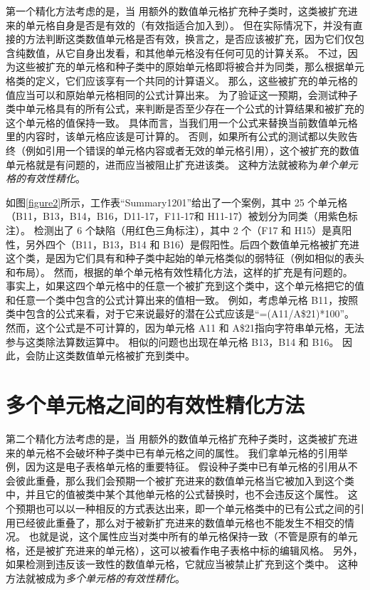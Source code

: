 第一个精化方法考虑的是，当 \wa 用额外的数值单元格扩充种子类时，这类被扩充进来的单元格自身是否是有效的（有效指适合加入到）。
但在实际情况下，并没有直接的方法判断这类数值单元格是否有效，换言之，是否应该被扩充，因为它们仅包含纯数值，从它自身出发看，和其他单元格没有任何可见的计算关系。
不过，因为这些被扩充的单元格和种子类中的原始单元格即将被合并为同类，那么根据单元格类的定义，它们应该享有一个共同的计算语义。
那么，这些被扩充的单元格的值应当可以和原始单元格相同的公式计算出来。
为了验证这一预期，\wa 会测试种子类中单元格具有的所有公式，来判断是否至少存在一个公式的计算结果和被扩充的这个单元格的值保持一致。
具体而言，当我们用一个公式来替换当前数值单元格里的内容时，该单元格应该是可计算的。
否则，如果所有公式的测试都以失败告终（例如引用一个错误的单元格内容或者无效的单元格引用），这个被扩充的数值单元格就是有问题的，进而应当被阻止扩充进该类。
这种方法就被称为\textit{单个单元格的有效性精化}。

如图\ref{figure2}所示，工作表“Summary1201”给出了一个案例，其中 25 个单元格（B11，B13，B14，B16，D11-17，F11-17和 H11-17）被\cu 划分为同类（用紫色标注）。
\cu 检测出了 6 个缺陷（用红色三角标注），其中 2 个（F17 和 H15）是真阳性，另外四个（B11，B13，B14 和 B16）是假阳性。后四个数值单元格被扩充进这个类，是因为它们具有和种子类中起始的单元格类似的弱特征（例如相似的表头和布局）。
然而，根据\wa 的单个单元格有效性精化方法，这样的扩充是有问题的。
事实上，如果这四个单元格中的任意一个被扩充到这个类中，这个单元格把它的值和任意一个类中包含的公式计算出来的值相一致。
例如，考虑单元格 B11，按照类中包含的公式来看，对于它来说最好的潜在公式应该是“=(A11/A\$21)*100”。
然而，这个公式是不可计算的，因为单元格 A11 和 A\$21指向字符串单元格，无法参与这类除法算数运算中。
相似的问题也出现在单元格 B13，B14 和 B16。 
因此，\wa 会防止这类数值单元格被扩充到类中。

\section{多个单元格之间的有效性精化方法}



第二个精化方法考虑的是，当 \wa 用额外的数值单元格扩充种子类时，这类被扩充进来的单元格不会破坏种子类中已有单元格之间的属性。
我们拿单元格的引用举例，因为这是电子表格单元格的重要特征。
假设种子类中已有单元格的引用从不会彼此重叠，那么我们会预期一个被扩充进来的数值单元格当它被加入到这个类中，并且它的值被类中某个其他单元格的公式替换时，也不会违反这个属性。
这个预期也可以以一种相反的方式表达出来，即一个单元格类中的已有公式之间的引用已经彼此重叠了，那么对于被新扩充进来的数值单元格也不能发生不相交的情况。
也就是说，这个属性应当对类中所有的单元格保持一致（不管是原有的单元格，还是被扩充进来的单元格），这可以被看作电子表格中标的编辑风格。
另外，如果检测到违反该一致性的数值单元格，它就应当被禁止扩充到这个类中。
这种方法就被成为\textit{多个单元格的有效性精化}。

